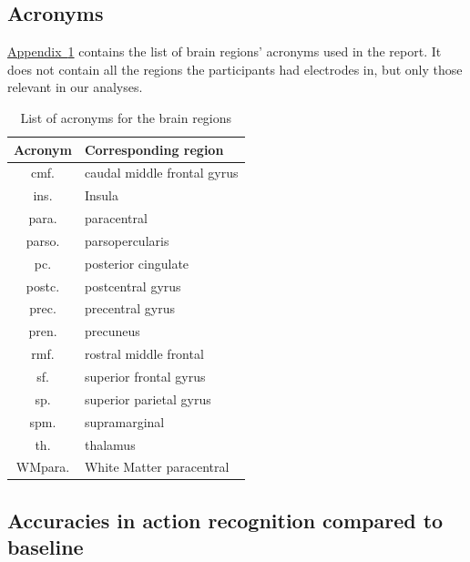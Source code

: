 \documentclass[10pt,conference,compsocconf]{IEEEtran}
\newcommand{\aref}[1]{\hyperref[#1]{Appendix~\ref*{#1}}}
\begin{document}
\subsection{Acronyms}
\aref{apptab:acronyms} contains the list of brain regions' acronyms used in the report. It does not contain all the regions the participants had electrodes in, but only those relevant in our analyses.

\begin{table}[h!]
    \centering
    \begin{tabular}{| c | l |}
        \hline
        Acronym & Corresponding region \\
        \hline
        cmf. & caudal middle frontal gyrus \\
        ins. & Insula \\
        para. & paracentral \\
        parso. & parsopercularis \\
        pc. & posterior cingulate \\
        postc. & postcentral gyrus \\
        prec. & precentral gyrus \\
	      pren. & precuneus \\
        rmf. & rostral middle frontal \\
        sf. & superior frontal gyrus \\
	      sp. & superior parietal gyrus \\
	      spm. & supramarginal \\
	      th. & thalamus \\
        WMpara. & White Matter paracentral \\
        \hline
    \end{tabular}
    \caption{List of acronyms for the brain regions}
    \label{apptab:acronyms}
\end{table}

\subsection{Accuracies in action recognition compared to baseline}
\end{document}
